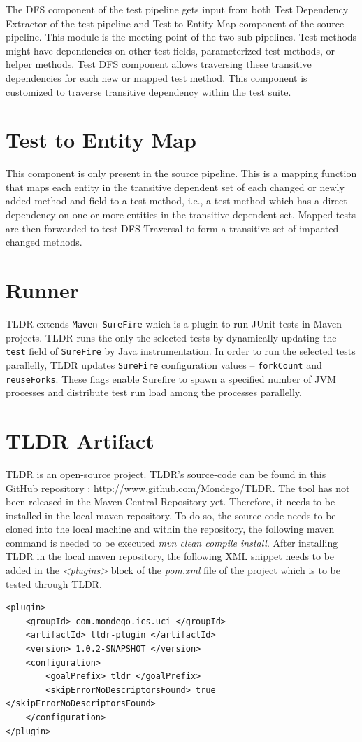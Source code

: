 The DFS component of the test pipeline gets input from both Test Dependency Extractor of the test pipeline and Test to Entity Map component of the source pipeline. This module is the meeting point of the two sub-pipelines. Test methods might have dependencies on other test fields, parameterized test methods, or helper methods. Test DFS component allows traversing these transitive dependencies for each new or mapped test method. This component is customized to traverse transitive dependency within the test suite.


\section{Test to Entity Map}

This component is only present in the source pipeline. This is a mapping function that maps each entity in the transitive dependent set of each changed or newly added method and field to a test method, i.e., a test method which has a direct dependency on one or more entities in the transitive dependent set. Mapped tests are then forwarded to test DFS Traversal to form a transitive set of impacted changed methods. 

\section{Runner}

TLDR extends \texttt{Maven SureFire} which is a plugin to run JUnit tests in Maven projects. TLDR runs the only the selected tests by dynamically updating the \texttt{test} field of \texttt{SureFire} by Java instrumentation. In order to run the selected tests parallelly, TLDR updates \texttt{SureFire} configuration values -- \texttt{forkCount} and \texttt{reuseForks}. These flags enable Surefire to spawn a specified number of JVM processes and distribute test run load among the processes parallelly.


\section{TLDR Artifact}

TLDR is an open-source project. TLDR's source-code can be found in this GitHub repository : \href{url}{http://www.github.com/Mondego/TLDR}. The tool has not been released in the Maven Central Repository yet. Therefore, it needs to be installed in the local maven repository. To do so, the source-code needs to be cloned into the local machine and within the repository, the following maven command is needed to be executed \textit{mvn clean compile install}. After installing TLDR in the local maven repository, the following XML snippet needs to be added in the \textit{<plugins>} block of the \textit{pom.xml} file of the project which is to be tested through TLDR. 
\newline
\begin{lstlisting}
<plugin>
	<groupId> com.mondego.ics.uci </groupId>
	<artifactId> tldr-plugin </artifactId>
	<version> 1.0.2-SNAPSHOT </version>
	<configuration>
		<goalPrefix> tldr </goalPrefix>
		<skipErrorNoDescriptorsFound> true </skipErrorNoDescriptorsFound>
	</configuration>				
</plugin>
\end{lstlisting}

